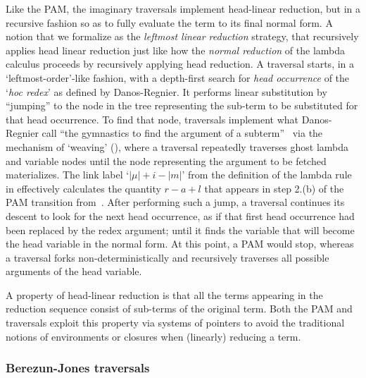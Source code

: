 \documentclass[xchauthor,chkrefs,GCNS,amsmath,amsthm,rotating,leaveRGB]{tcsg}
\theoremstyle{plain}
\theoremstyle{definition}
\begin{document}
Like the PAM, the imaginary traversals implement head-linear reduction, but
in a recursive fashion so as to fully evaluate the term to its final normal
form. A notion that we formalize as the \emph{leftmost linear reduction}
strategy, that recursively applies head linear reduction just like how the
\emph{normal reduction} of the lambda calculus proceeds by recursively
applying head reduction. A traversal starts, in a `leftmost-order'-like
fashion, with a depth-first search for \emph{head occurrence} of the
`\emph{hoc redex}' as defined by Danos-Regnier. It performs linear
substitution by ``jumping'' to the node in the tree representing the sub-term
to be substituted for that head occurrence. To find that node, traversals
implement what Danos-Regnier call ``the gymnastics to find the argument of a
subterm''~\cite{danos-head} via the mechanism of `weaving'
(), where a traversal repeatedly
traverses ghost lambda and variable nodes until the node representing the
argument to be fetched materializes. The link label `$|\mu |+i-|m|$' from the
definition of the lambda rule in 
effectively calculates the quantity $r-a+l$ that appears in step 2.(b) of the
PAM transition from~\cite{danos-head}. After performing such a jump, a
traversal continues its descent to look for the next head occurrence, as if
that first head occurrence had been replaced by the redex argument; until it
finds the variable that will become the head variable in the normal form. At
this point, a PAM would stop, whereas a traversal forks
non-deterministically and recursively traverses all possible arguments of the
head variable.

A property of head-linear reduction is that all the terms appearing in the
reduction sequence consist of sub-terms of the original term. Both the PAM
and traversals exploit this property via systems of pointers to avoid the
traditional notions of environments or closures when (linearly) reducing a
term.

\subsubsection{Berezun-Jones traversals}\label{sec1.3.3}
\end{document}
